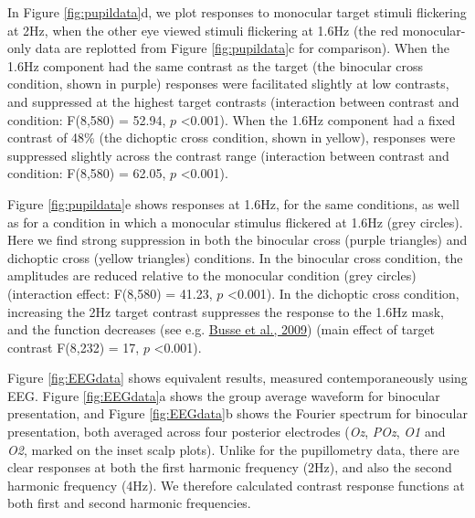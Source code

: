 \documentclass[
]{article}
\begin{document}
In Figure \ref{fig:pupildata}d, we plot responses to monocular target stimuli flickering at 2Hz, when the other eye viewed stimuli flickering at 1.6Hz (the red monocular-only data are replotted from Figure \ref{fig:pupildata}c for comparison). When the 1.6Hz component had the same contrast as the target (the binocular cross condition, shown in purple) responses were facilitated slightly at low contrasts, and suppressed at the highest target contrasts (interaction between contrast and condition: F(8,580) = 52.94, \(p\) \textless0.001). When the 1.6Hz component had a fixed contrast of 48\% (the dichoptic cross condition, shown in yellow), responses were suppressed slightly across the contrast range (interaction between contrast and condition: F(8,580) = 62.05, \(p\) \textless0.001).

Figure \ref{fig:pupildata}e shows responses at 1.6Hz, for the same conditions, as well as for a condition in which a monocular stimulus flickered at 1.6Hz (grey circles). Here we find strong suppression in both the binocular cross (purple triangles) and dichoptic cross (yellow triangles) conditions. In the binocular cross condition, the amplitudes are reduced relative to the monocular condition (grey circles) (interaction effect: F(8,580) = 41.23, \(p\) \textless0.001). In the dichoptic cross condition, increasing the 2Hz target contrast suppresses the response to the 1.6Hz mask, and the function decreases (see e.g. \protect\hyperlink{ref-Busse2009}{Busse et al., 2009}) (main effect of target contrast F(8,232) = 17, \(p\) \textless0.001).

Figure \ref{fig:EEGdata} shows equivalent results, measured contemporaneously using EEG. Figure \ref{fig:EEGdata}a shows the group average waveform for binocular presentation, and Figure \ref{fig:EEGdata}b shows the Fourier spectrum for binocular presentation, both averaged across four posterior electrodes (\emph{Oz}, \emph{POz}, \emph{O1} and \emph{O2}, marked on the inset scalp plots). Unlike for the pupillometry data, there are clear responses at both the first harmonic frequency (2Hz), and also the second harmonic frequency (4Hz). We therefore calculated contrast response functions at both first and second harmonic frequencies.
\end{document}
